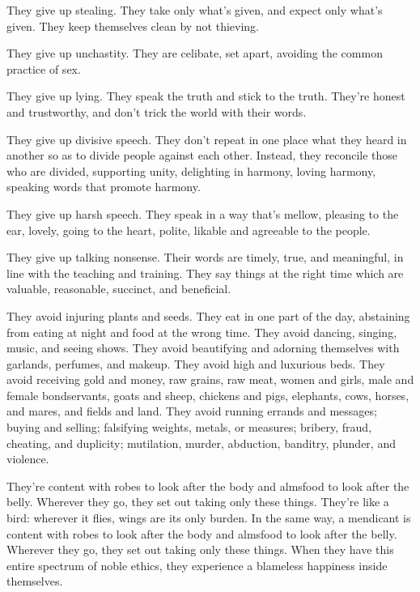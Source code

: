 \documentclass[12pt,openany]{book}%
\begin{document}
They give up stealing. They take only what’s given, and expect only what’s given. They keep themselves clean by not thieving. 

They give up unchastity. They are celibate, set apart, avoiding the common practice of sex. 

They give up lying. They speak the truth and stick to the truth. They’re honest and trustworthy, and don’t trick the world with their words. 

They give up divisive speech. They don’t repeat in one place what they heard in another so as to divide people against each other. Instead, they reconcile those who are divided, supporting unity, delighting in harmony, loving harmony, speaking words that promote harmony. 

They give up harsh speech. They speak in a way that’s mellow, pleasing to the ear, lovely, going to the heart, polite, likable and agreeable to the people. 

They give up talking nonsense. Their words are timely, true, and meaningful, in line with the teaching and training. They say things at the right time which are valuable, reasonable, succinct, and beneficial. 

They avoid injuring plants and seeds. They eat in one part of the day, abstaining from eating at night and food at the wrong time. They avoid dancing, singing, music, and seeing shows. They avoid beautifying and adorning themselves with garlands, perfumes, and makeup. They avoid high and luxurious beds. They avoid receiving gold and money, raw grains, raw meat, women and girls, male and female bondservants, goats and sheep, chickens and pigs, elephants, cows, horses, and mares, and fields and land. They avoid running errands and messages; buying and selling; falsifying weights, metals, or measures; bribery, fraud, cheating, and duplicity; mutilation, murder, abduction, banditry, plunder, and violence. 

They’re content with robes to look after the body and almsfood to look after the belly. Wherever they go, they set out taking only these things. They’re like a bird: wherever it flies, wings are its only burden. In the same way, a mendicant is content with robes to look after the body and almsfood to look after the belly. Wherever they go, they set out taking only these things. When they have this entire spectrum of noble ethics, they experience a blameless happiness inside themselves. 
\end{document}

